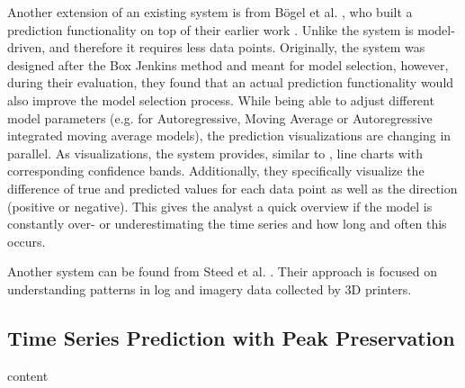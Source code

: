 \documentclass[electronic]{vgtc}             %
\begin{document}
Another extension of an existing system is from B{\"o}gel et al. \cite{boegel:2013}, who built a prediction functionality on top of their earlier work \cite{boegel:2013}.
Unlike \cite{Hochheiser:2004, buono:2005, buono:2007} the system is model-driven, and therefore it requires less data points.
Originally, the system was designed after the Box Jenkins method \cite{box:1976} and meant for model selection, however, during their evaluation, they found that an actual prediction functionality would also improve the model selection process.
While being able to adjust different model parameters (e.g. for Autoregressive, Moving Average or Autoregressive integrated moving average models), the prediction visualizations are changing in parallel. 
As visualizations, the system provides, similar to \cite{buono:2007}, line charts with corresponding confidence bands.
Additionally, they specifically visualize the difference of true and predicted values for each data point as well as the direction (positive or negative).
This gives the analyst a quick overview if the model is constantly over- or underestimating the time series and how long and often this occurs.

Another system can be found from Steed et al. \cite{steed:2017}.
Their approach is focused on understanding patterns in log and imagery data collected by 3D printers.



\subsection{Time Series Prediction with Peak Preservation \label{subsec:peak}}
content
\end{document}
